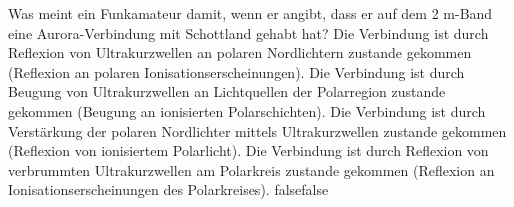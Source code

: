     {Was meint ein Funkamateur damit, wenn er angibt, dass er auf dem 2 m-Band eine Aurora-Verbindung mit Schottland gehabt hat?}
    {Die Verbindung ist durch Reflexion von Ultrakurzwellen an polaren Nordlichtern zustande gekommen (Reflexion an polaren Ionisationserscheinungen).}
    {Die Verbindung ist durch Beugung von Ultrakurzwellen an Lichtquellen der Polarregion zustande gekommen (Beugung an ionisierten Polarschichten).}
    {Die Verbindung ist durch Verstärkung der polaren Nordlichter mittels Ultrakurzwellen zustande gekommen (Reflexion von ionisiertem Polarlicht).}
    {Die Verbindung ist durch Reflexion von verbrummten Ultrakurzwellen am Polarkreis zustande gekommen (Reflexion an Ionisationserscheinungen des Polarkreises).}
    {false}{false}